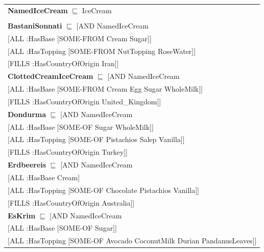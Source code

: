 \documentclass[12pt]{article}
\newcommand*{\MyIndent}{\hspace*{7em}}
\begin{document}
\begin{tabularx}{1\textwidth}{@{}X@{}}
            \textbf{NamedIceCream} $\sqsubseteq$ IceCream \\ \tabularnewline

            \textbf{BastaniSonnati} $\sqsubseteq$ [AND NamedIceCream \\
                                                        \MyIndent [ALL :HasBase [SOME-FROM Cream Sugar]] \\
                                                        \MyIndent [ALL :HasTopping [SOME-FROM NutTopping RoseWater]] \\
                                                        \MyIndent [FILLS :HasCountryOfOrigin Iran]] \\
        	\textbf{ClottedCreamIceCream} $\sqsubseteq$ [AND NamedIceCream \\
                                                    \MyIndent [ALL :HasBase [SOME-FROM Cream Egg Sugar WholeMilk]] \\
                                                    \MyIndent [FILLS :HasCountryOfOrigin United\_Kingdom]] \\
        	\textbf{Dondurma} $\sqsubseteq$ [AND NamedIceCream \\
                                                    \MyIndent [ALL :HasBase [SOME-OF Sugar WholeMilk]] \\
                                                    \MyIndent [ALL :HasTopping [SOME-OF Pistachios Salep Vanilla]] \\
                                                    \MyIndent [FILLS :HasCountryOfOrigin Turkey]] \\
        	\textbf{Erdbeereis} $\sqsubseteq$ [AND NamedIceCream \\
                                                    \MyIndent [ALL :HasBase Cream] \\
                                                    \MyIndent [ALL :HasTopping [SOME-OF Chocolate Pistachios Vanilla]] \\
                                                    \MyIndent [FILLS :HasCountryOfOrigin Australia]] \\
        	\textbf{EsKrim} $\sqsubseteq$ [AND NamedIceCream \\
                                                    \MyIndent [ALL :HasBase [SOME-OF Sugar]] \\
                                                    \MyIndent [ALL :HasTopping [SOME-OF Avocado CoconutMilk Durian PandanusLeaves]] \\

\end{tabularx}
\end{document}
